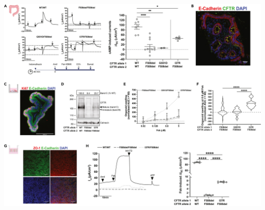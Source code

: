 \begin{center}
\includegraphics[width=\textwidth]{figures/I37R/rectal_organoids.jpg}
\label{I37R_figure1}
\end{center}
\begingroup
